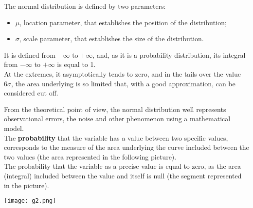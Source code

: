 \begin{frame}
  \vspace*{.5cm}
  The normal distribution is defined by two parameters:
  \begin{itemize}
    \item $ \mu $, location parameter, that establishes the position of the distribution;
    \item $ \sigma $, scale parameter, that establishes the size of the distribution.
  \end{itemize}
  \vspace*{.75cm}
  It is defined from $ -\infty $ to $ +\infty $, and, as it is a probability distribution, its integral from $ -\infty $ to $ +\infty $ is equal to 1.\\
  \vspace*{.75cm}
  At the extremes, it asymptotically tends to zero, and in the tails over the value $6\sigma$, the area underlying is so limited that, with a good approximation, can be considered cut off.
\end{frame}

\begin{frame}
  \vspace*{.5cm}
  From the theoretical point of view, the normal distribution well represents observational errors, the noise and other phenomenon using a mathematical model.\\
  \vspace*{.75cm}
  The \textbf{probability} that the variable has a value between two specific values, corresponds to the measure of the area underlying the curve included between the two values (the area represented in the following picture).\\
  \vspace*{.75cm}
  The probability that the variable as a precise value is equal to zero, as the area (integral) included between the value and itself is null (the segment represented in the picture).
\end{frame}

\begin{frame}
  \begin{center}
    \texttt{[image: g2.png]}
  \end{center}
\end{frame}

